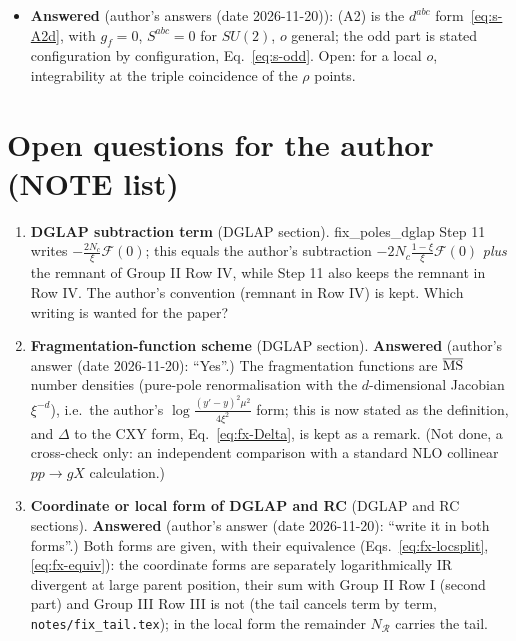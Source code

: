 \documentclass[9pt]{article}
\numberwithin{equation}{section}
\begin{document}
{\begin{itemize}
\item[(5)] \textbf{Answered} (author's answers (date 2026-11-20)): (A2) is the $d^{abc}$ form~\eqref{eq:s-A2d}, with $g_{f}=0$, $S^{abc}=0$ for $SU(2)$, $o$ general; the odd part is stated configuration by configuration, Eq.~\eqref{eq:s-odd}. Open: for a local $o$, integrability at the triple coincidence of the $\rho$ points.
\end{itemize}

}\par

{\color{red}
\section{Open questions for the author (NOTE list)}
\begin{enumerate}
\item \textbf{DGLAP subtraction term} (DGLAP section). fix\_poles\_dglap Step 11 writes $-\frac{2N_{c}}{\xi}\mathcal{F}(0)$; this equals the author's subtraction $-2N_{c}\frac{1-\xi}{\xi}\mathcal{F}(0)$ \emph{plus} the remnant of Group II Row IV, while Step 11 also keeps the remnant in Row IV. The author's convention (remnant in Row IV) is kept. Which writing is wanted for the paper?
\item \textbf{Fragmentation-function scheme} (DGLAP section). \textbf{Answered} (author's answer (date 2026-11-20): ``Yes''.) The fragmentation functions are $\overline{\rm MS}$ number densities (pure-pole renormalisation with the $d$-dimensional Jacobian $\xi^{-d}$), i.e.\ the author's $\log\frac{(y'-y)^{2}\mu^{2}}{4\xi^{2}}$ form; this is now stated as the definition, and $\Delta$ to the CXY form, Eq.~\eqref{eq:fx-Delta}, is kept as a remark. (Not done, a cross-check only: an independent comparison with a standard NLO collinear $pp\to gX$ calculation.)
\item \textbf{Coordinate or local form of DGLAP and RC} (DGLAP and RC sections). \textbf{Answered} (author's answer (date 2026-11-20): ``write it in both forms''.) Both forms are given, with their equivalence (Eqs.~\eqref{eq:fx-locsplit}, \eqref{eq:fx-equiv}): the coordinate forms are separately logarithmically IR divergent at large parent position, their sum with Group II Row I (second part) and Group III Row III is not (the tail cancels term by term, \texttt{notes/fix\_tail.tex}); in the local form the remainder $N_{\mathcal{R}}$ carries the tail.

\end{enumerate}}
\end{document}
